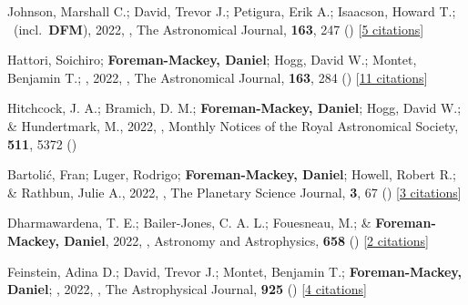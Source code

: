 \item[{\color{numcolor}\scriptsize80}] Johnson, Marshall C.; David, Trevor J.; Petigura, Erik A.; Isaacson, Howard T.; \etal\ (incl.\ \textbf{DFM}), 2022, , The Astronomical Journal, \textbf{163}, 247 () [\href{https://ui.adsabs.harvard.edu/abs/2022AJ....163..247J}{5 citations}]

\item[{\color{numcolor}\scriptsize79}] Hattori, Soichiro; \textbf{Foreman-Mackey, Daniel}; Hogg, David W.; Montet, Benjamin T.; \etal, 2022, , The Astronomical Journal, \textbf{163}, 284 () [\href{https://ui.adsabs.harvard.edu/abs/2022AJ....163..284H}{11 citations}]

\item[{\color{numcolor}\scriptsize78}] Hitchcock, J. A.; Bramich, D. M.; \textbf{Foreman-Mackey, Daniel}; Hogg, David W.; \& Hundertmark, M., 2022, , Monthly Notices of the Royal Astronomical Society, \textbf{511}, 5372 ()

\item[{\color{numcolor}\scriptsize77}] Bartoli{\'c}, Fran; Luger, Rodrigo; \textbf{Foreman-Mackey, Daniel}; Howell, Robert R.; \& Rathbun, Julie A., 2022, , The Planetary Science Journal, \textbf{3}, 67 () [\href{https://ui.adsabs.harvard.edu/abs/2022PSJ.....3...67B}{3 citations}]

\item[{\color{numcolor}\scriptsize76}] Dharmawardena, T. E.; Bailer-Jones, C. A. L.; Fouesneau, M.; \& \textbf{Foreman-Mackey, Daniel}, 2022, , Astronomy and Astrophysics, \textbf{658} () [\href{https://ui.adsabs.harvard.edu/abs/2022A&A...658A.166D}{2 citations}]

\item[{\color{numcolor}\scriptsize75}] Feinstein, Adina D.; David, Trevor J.; Montet, Benjamin T.; \textbf{Foreman-Mackey, Daniel}; \etal, 2022, , The Astrophysical Journal, \textbf{925} () [\href{https://ui.adsabs.harvard.edu/abs/2022ApJ...925L...2F}{4 citations}]

